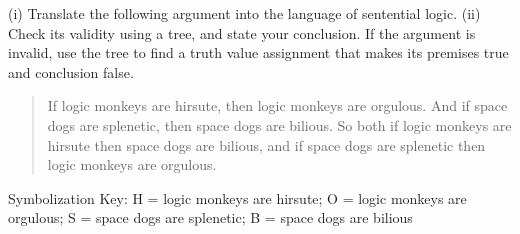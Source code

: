 \documentclass[12pt]{article}
\begin{document}



\item (i) Translate the following argument into the language of sentential logic. (ii) Check its validity using a tree, and state your conclusion. If the argument is invalid, use the tree to find a truth value assignment that makes its premises true and conclusion false.

\begin{quote}
If logic monkeys are hirsute, then logic monkeys are orgulous. And if space dogs are splenetic, then space dogs are bilious. So both if logic monkeys are hirsute then space dogs are bilious, and if space dogs are splenetic then logic monkeys are orgulous. 
\end{quote}

Symbolization Key: H = logic monkeys are hirsute; O = logic monkeys are orgulous; S = space dogs are splenetic; B = space dogs are bilious

\fi 
\end{document}
